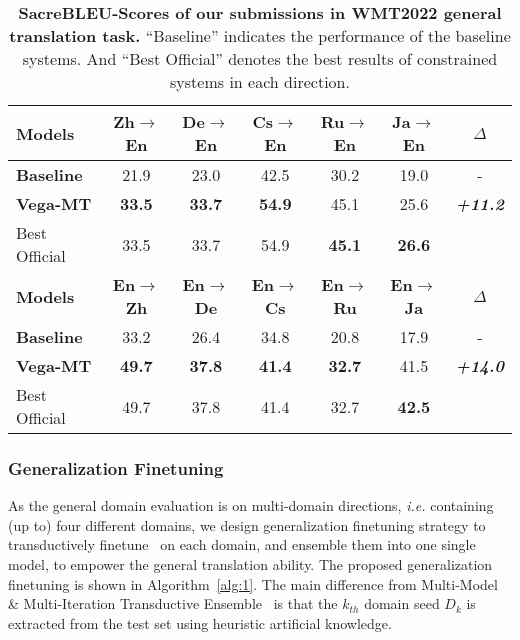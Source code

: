 \documentclass[11pt,a4paper]{article}
\newcommand{\zct}{\color{black}}
\begin{document}
\begin{table*}[t!]
    \centering 
    \begin{tabular}{lcccccc}
    \toprule 
    \textbf{Models}        & \textbf{Zh$\rightarrow$En} & \textbf{De$\rightarrow$En} & \textbf{Cs$\rightarrow$En} & \textbf{Ru$\rightarrow$En} & \textbf{Ja$\rightarrow$En} & \textbf{$\Delta$} \\\hline
    \textbf{Baseline}      & 21.9            & 23.0            & 42.5            & 30.2            & 19.0     & -\\
    \textbf{Vega-MT}    & \textbf{33.5}   & \textbf{33.7}   & \textbf{54.9}   & 45.1            & 25.6        &\textit{\textbf{+11.2}}\\\hdashline
    {Best Official} & 33.5            & 33.7            & 54.9            &\bf 45.1            &\bf 26.6     & \\\midrule
    \textbf{Models}        & \textbf{En$\rightarrow$Zh} & \textbf{En$\rightarrow$De} & \textbf{En$\rightarrow$Cs} & \textbf{En$\rightarrow$Ru} & \textbf{En$\rightarrow$Ja} & \textbf{$\Delta$}\\\hline
    \textbf{Baseline}      & 33.2            & 26.4            & 34.8            & 20.8            & 17.9     & -\\
    \textbf{Vega-MT}    & \textbf{49.7}   & \textbf{37.8}   & \textbf{41.4}   & \textbf{32.7}   & 41.5        &\textit{\textbf{+14.0}}\\\hdashline
    {Best Official} & 49.7            & 37.8            & 41.4            & 32.7            &\bf 42.5     & \\
    \bottomrule
    \end{tabular}
    \caption{\label{tab:sacrebleu} \textbf{SacreBLEU-Scores of our submissions in WMT2022 general translation task.} ``Baseline'' indicates the performance of the baseline systems. And ``Best Official'' denotes the best results {\zct of constrained systems} in each direction.}
\end{table*}

\subsubsection{Generalization Finetuning}
\label{ssec:general-ft}
As the general domain evaluation is on multi-domain directions, \textit{i.e.} containing (up to) four different domains, we design generalization finetuning strategy to transductively finetune~\cite{Wang2020TransductiveEL} on each domain, and ensemble them into one single model, to empower the general translation ability. 
The proposed generalization finetuning is shown in Algorithm~\ref{alg:1}.
The main difference from Multi-Model \& Multi-Iteration Transductive Ensemble~\cite{wang-etal-2021-tencent} is that the $k_{th}$ domain seed $D_k$ is extracted from the test set using heuristic artificial knowledge. 
\end{document}

